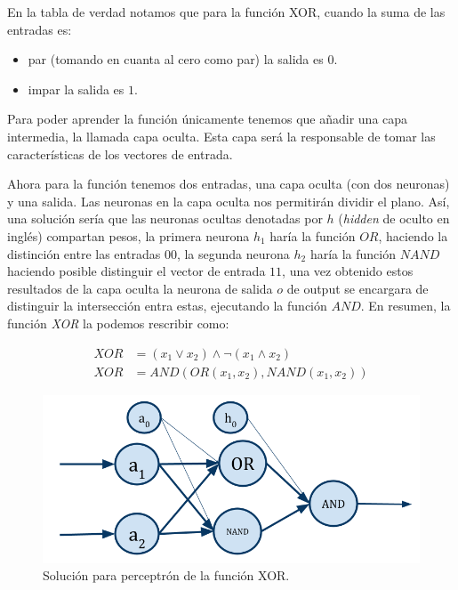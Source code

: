 En la tabla de verdad notamos que para la función XOR, cuando la suma de las entradas es:
\begin{itemize}
 \item par (tomando en cuanta al cero como par) la salida es $0$.
 \item impar la salida es $1$.
\end{itemize}


Para poder aprender la función únicamente tenemos que añadir una capa intermedia, la llamada capa oculta. Esta capa será la responsable de tomar las características de los vectores de entrada.


Ahora para la función tenemos dos entradas, una capa oculta (con dos neuronas) y una salida. Las neuronas en la capa oculta nos permitirán dividir el plano. Así, una solución sería que las neuronas ocultas denotadas por $h$ (\emph{hidden} de oculto en inglés) compartan pesos, la primera neurona $h_1$ haría la función $OR$, haciendo la distinción entre las entradas $0 0$, la segunda neurona $h_2$ haría la función $NAND$ haciendo posible distinguir el vector de entrada $1 1$, una vez obtenido estos resultados de la capa oculta la neurona de salida $o$ de output se encargara de distinguir la intersección entra estas, ejecutando la función $AND$. En resumen, la función \emph{XOR} la podemos rescribir como:


\begin{equation}
 \begin{split}
    XOR &= (x_{1} \vee x_{2}) \wedge \neg(x_{1} \wedge x_{2}) \\
    XOR &= AND (OR(x_{1}, x_{2}), NAND(x_{1}, x_{2}))
 \end{split}
\end{equation}

\begin{figure}[H]
 \centering
 \includegraphics[scale=0.3]{../Figuras/xor.png}
 \caption{Solución para perceptrón de la función XOR.}
 \label{fig:pXorSol}
\end{figure}





